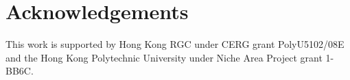 

\section*{Acknowledgements}      %

This work is supported by Hong Kong RGC under CERG grant PolyU5102/08E and the Hong Kong Polytechnic University under Niche Area Project grant 1-BB6C.



